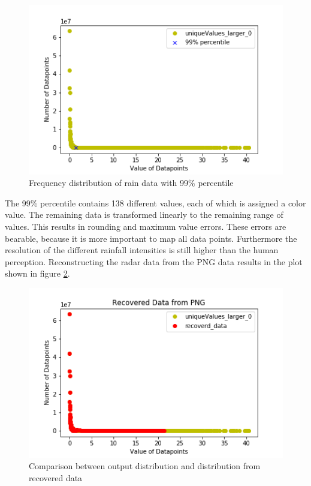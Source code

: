 \documentclass[oneside]{htwg-report}
\begin{document}
\begin{figure}[ht]
    \centering
    \includegraphics[width=1\linewidth,angle=0]{../abb/Radardatapoints_of_June_2016_larger0_99percentile.png}
    \caption[Datenaufbereitung]{Frequency distribution of rain data with 99\% percentile}
    \label{fig:Radardatapoints_of_June_2016_larger0_99percentile}
\end{figure}
\begin{sloppypar}
The 99\% percentile contains 138 different values, each of which is assigned a color value.
The remaining data is transformed linearly to the remaining range of values.
This results in rounding and maximum value errors. These errors are bearable, because it is more important to map all data points.
Furthermore the resolution of the different rainfall intensities is still higher than the human perception.
Reconstructing the radar data from the PNG data results in the plot shown in figure \ref{fig:Radardatapoints_of_June_2016_RecoveredData}.
\end{sloppypar}
\begin{figure}[ht]
    \centering
    \includegraphics[width=1\linewidth,angle=0]{../abb/Radardatapoints_of_June_2016_RecoveredData.png}
    \caption[Datenaufbereitung]{Comparison between output distribution and distribution from recovered data}
    \label{fig:Radardatapoints_of_June_2016_RecoveredData}
\end{figure}
\end{document}
